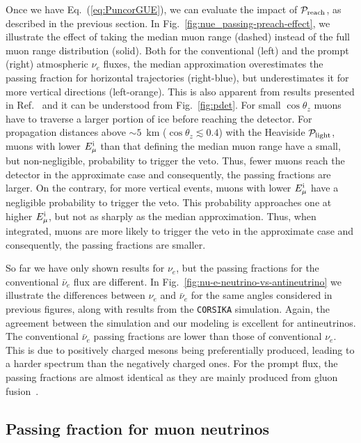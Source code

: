 \documentclass[aps,prd,showpacs,letterpaper,onecolumn,longbibliography,superscriptaddress,notitlepage,nofootinbib]{revtex4-1}%
\newcommand{\Emi}{E_{\mu}^{\rm i}}
\newcommand{\Prob}{{\cal P}}
\newcommand{\CORSIKA}{\texttt{CORSIKA}}
\begin{document}
Once we have Eq.~(\ref{eq:PuncorGUE}), we can evaluate the impact of $\Prob_{\rm reach}$, as described in the previous section. In Fig.~\ref{fig:nue_passing-preach-effect}, we illustrate the effect of taking the median muon range (dashed) instead of the full muon range distribution (solid). Both for the conventional (left) and the prompt (right) atmospheric $\nu_e$ fluxes, the median approximation overestimates the passing fraction for horizontal trajectories (right-blue), but underestimates it for more vertical directions (left-orange). This is also apparent from results presented in Ref.~\cite{Gaisser:2014bja} and it can be understood from Fig.~\ref{fig:pdet}. For small $\cos \theta_z$ muons have to traverse a larger portion of ice before reaching the detector. For propagation distances above $\sim 5$~km ($\cos \theta_z \lesssim 0.4$) with the Heaviside $\Prob_{\rm light}$, muons with lower $\Emi$ than that defining the median muon range have a small, but non-negligible, probability to trigger the veto. Thus, fewer muons reach the detector in the approximate case and consequently, the passing fractions are larger. On the contrary, for more vertical events, muons with lower $\Emi$ have a negligible probability to trigger the veto. This probability approaches one at higher $\Emi$, but not as sharply as the median approximation. Thus, when integrated, muons are more likely to trigger the veto in the approximate case and consequently, the passing fractions are smaller.

So far we have only shown results for $\nu_e$, but the passing fractions for the conventional $\bar\nu_e$ flux are different. In Fig.~\ref{fig:nu-e-neutrino-vs-antineutrino} we illustrate the differences between $\nu_e$ and $\bar\nu_e$ for the same angles considered in previous figures, along with results from the \CORSIKA{} simulation. Again, the agreement between the simulation and our modeling is excellent for antineutrinos. The conventional $\bar\nu_e$ passing fractions are lower than those of conventional $\nu_e$. This is due to positively charged mesons being preferentially produced, leading to a harder spectrum than the negatively charged ones. For the prompt flux, the passing fractions are almost identical as they are mainly produced from gluon fusion~\cite{Arguelles:2015wba}.

\subsection{Passing fraction for muon neutrinos}
\label{sec:pfnumu}
\end{document}

